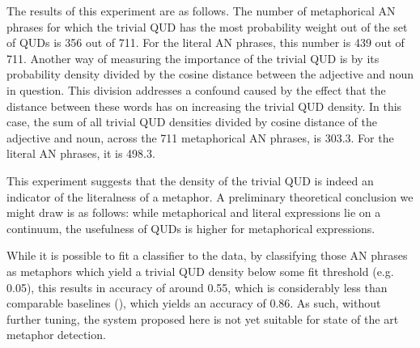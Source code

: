 \documentclass[10pt,letterpaper,twocolumn]{article}
\begin{document}
The results of this experiment are as follows. The number of metaphorical AN phrases for which the trivial QUD has the most probability weight out of the set of QUDs is 356 out of 711. For the literal AN phrases, this number is 439 out of 711. Another way of measuring the importance of the trivial QUD is by its probability density divided by the cosine distance between the adjective and noun in question. This division addresses a confound caused by the effect that the distance between these words has on increasing the trivial QUD density. In this case, the sum of all trivial QUD densities divided by cosine distance of the adjective and noun, across the 711 metaphorical AN phrases, is  303.3. For the literal AN phrases, it is 498.3.

This experiment suggests that the density of the trivial QUD is indeed an indicator of the literalness of a metaphor. A preliminary theoretical conclusion we might draw is as follows: while metaphorical and literal expressions lie on a continuum, the usefulness of QUDs is higher for metaphorical expressions.

While it is possible to fit a classifier to the data, by classifying those AN phrases as metaphors which yield a trivial QUD density below some fit threshold (e.g. 0.05), this results in accuracy of around 0.55, which is considerably less than comparable baselines (\cite{tsvetkov2014metaphor}), which yields an accuracy of 0.86. As such, without further tuning, the system proposed here is not yet suitable for state of the art metaphor detection.





\end{document}
